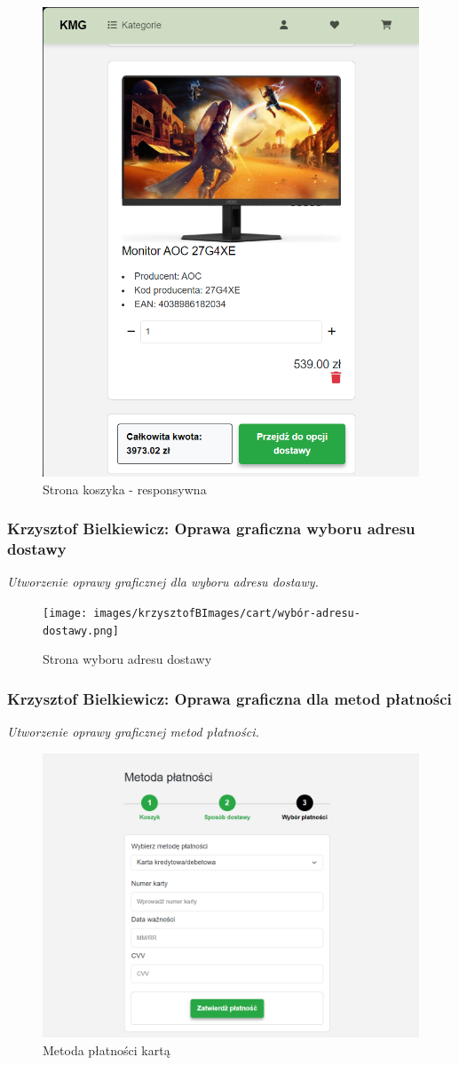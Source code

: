 \documentclass[12pt,a4paper,oneside]{article}
\theoremstyle{definition}
\numberwithin{equation}{section}
\begin{document}
\begin{figure}[H]
    \centering
    \includegraphics[width=0.5\columnwidth]{images/krzysztofBImages/cart/cart-step1-respo.png}
    \caption{Strona koszyka - responsywna}
    \label{cart-step1-respo}
\end{figure}

\subsubsection{Krzysztof Bielkiewicz: Oprawa graficzna wyboru adresu dostawy}
\label{1.3.9}
\textit{Utworzenie oprawy graficznej dla wyboru adresu dostawy.}
\begin{figure}[H]
    \centering
    \texttt{[image: images/krzysztofBImages/cart/wybór-adresu-dostawy.png]}
    \caption{Strona wyboru adresu dostawy}
    \label{płatność-kartą}
\end{figure}

\subsubsection{Krzysztof Bielkiewicz: Oprawa graficzna dla metod płatności}
\label{1.3.10}
\textit{Utworzenie oprawy graficznej metod płatności. }
\begin{figure}[H]
    \centering
    \includegraphics[width=0.8\columnwidth]{images/krzysztofBImages/cart/metody-płatności-karta.png}
    \caption{Metoda płatności kartą}
    \label{płatność-karta}
\end{figure}
\end{document}
